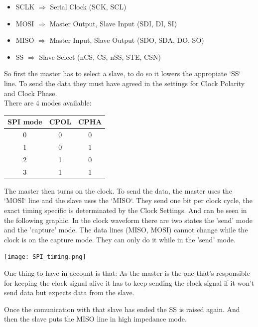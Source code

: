 \documentclass[12pt,a4paper,landscape]{article}
\begin{document}
\begin{multicols}{2}
		\begin{itemize}
			\item SCLK $\Rightarrow$ Serial Clock 
				(SCK, SCL)
			\item MOSI $\Rightarrow$  Master Output, Slave Input
				(SDI, DI, SI)
			\item MISO $\Rightarrow$  Master Input, Slave Output  
				(SDO, SDA, DO, SO)
			\item SS $\Rightarrow$  Slave Select
				(nCS, CS, nSS, STE, CSN)
		\end{itemize}
		So first the master has to select a slave, to do so it lowers the appropiate `SS` line. To send the data they must have agreed in the settings for Clock Polarity and Clock Phase.\\
		There are 4 modes available:

		\vspace{1em}
		\begin{tabular}{|c|c|c|}\hline
			SPI mode & CPOL & CPHA \\\hline
			0        & 0    & 0    \\\hline
			1        & 0    & 1    \\\hline
			2        & 1    & 0    \\\hline
			3        & 1    & 1    \\\hline
		\end{tabular}

		The master then turns on the clock. To send the data, the master uses the `MOSI` line and the slave uses the `MISO`. They send one bit per clock cycle, the exact timing specific is determinated by the Clock Settings. And can be seen in the following graphic. In the clock waveform there are two states the 'send' mode and the 'capture' mode. The data lines (MISO, MOSI) cannot change while the clock is on the capture mode. They can only do it while in the 'send' mode.

		\begin{center}
				\texttt{[image: SPI\_timing.png]}
		\end{center}

		One thing to have in account is that: As the master is the one that's responsible for keeping the clock signal alive it has to keep sending the clock signal if it won't send data but expects data from the slave.\\

		\vspace{0.5cm}

		Once the comunication with that slave has ended the SS is raised again. And then the slave puts the MISO line in high impedance mode.
	

\end{multicols}
\end{document}

